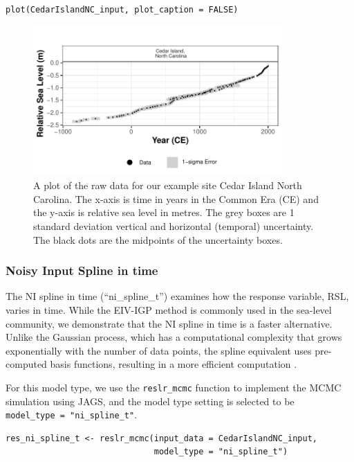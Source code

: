 \begin{verbatim}
plot(CedarIslandNC_input, plot_caption = FALSE)
\end{verbatim}

\begin{figure}

{\centering \includegraphics[width=360px]{RJ-2024-018_files/figure-latex/plotdata-1} 

}

\caption{A plot of the raw data for our example site Cedar Island North Carolina. The x-axis is time in years in the Common Era (CE) and the y-axis is relative sea level in metres. The grey boxes are 1 standard deviation vertical and horizontal (temporal) uncertainty. The black dots are the midpoints of the uncertainty boxes.}\label{fig:plotdata}
\end{figure}
\normalsize

\subsubsection{Noisy Input Spline in time}\label{nisplinet}

The NI spline in time (``ni\_spline\_t'') examines how the response variable, RSL, varies in time. While the EIV-IGP method is commonly used in the sea-level community, we demonstrate that the NI spline in time is a faster alternative. Unlike the Gaussian process, which has a computational complexity that grows exponentially with the number of data points, the spline equivalent uses pre-computed basis functions, resulting in a more efficient computation \citep{wood_2017}.

For this model type, we use the \texttt{reslr\_mcmc} function to implement the MCMC simulation using JAGS, and the model type setting is selected to be \texttt{model\_type\ =\ "ni\_spline\_t"}.
\scriptsize

\begin{verbatim}
res_ni_spline_t <- reslr_mcmc(input_data = CedarIslandNC_input,
                              model_type = "ni_spline_t")
\end{verbatim}

